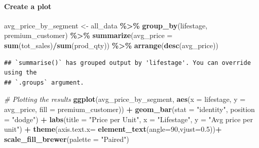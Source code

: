 \documentclass[
]{article}
\newenvironment{Shaded}{\begin{snugshade}}{\end{snugshade}}
\newcommand{\AttributeTok}[1]{\textcolor[rgb]{0.13,0.29,0.53}{#1}}
\newcommand{\CommentTok}[1]{\textcolor[rgb]{0.56,0.35,0.01}{\textit{#1}}}
\newcommand{\DecValTok}[1]{\textcolor[rgb]{0.00,0.00,0.81}{#1}}
\newcommand{\FloatTok}[1]{\textcolor[rgb]{0.00,0.00,0.81}{#1}}
\newcommand{\FunctionTok}[1]{\textcolor[rgb]{0.13,0.29,0.53}{\textbf{#1}}}
\newcommand{\NormalTok}[1]{#1}
\newcommand{\OtherTok}[1]{\textcolor[rgb]{0.56,0.35,0.01}{#1}}
\newcommand{\SpecialCharTok}[1]{\textcolor[rgb]{0.81,0.36,0.00}{\textbf{#1}}}
\newcommand{\StringTok}[1]{\textcolor[rgb]{0.31,0.60,0.02}{#1}}
\begin{document}
\hypertarget{create-a-plot-3}{%
\paragraph{Create a plot}\label{create-a-plot-3}}

\begin{Shaded}
\begin{Highlighting}[]
\NormalTok{avg\_price\_by\_segment }\OtherTok{\textless{}{-}}\NormalTok{ all\_data }\SpecialCharTok{\%\textgreater{}\%}
  \FunctionTok{group\_by}\NormalTok{(lifestage, premium\_customer) }\SpecialCharTok{\%\textgreater{}\%}
  \FunctionTok{summarize}\NormalTok{(}\AttributeTok{avg\_price =} \FunctionTok{sum}\NormalTok{(tot\_sales)}\SpecialCharTok{/}\FunctionTok{sum}\NormalTok{(prod\_qty)) }\SpecialCharTok{\%\textgreater{}\%}
  \FunctionTok{arrange}\NormalTok{(}\FunctionTok{desc}\NormalTok{(avg\_price))}
\end{Highlighting}
\end{Shaded}

\begin{verbatim}
## `summarise()` has grouped output by 'lifestage'. You can override using the
## `.groups` argument.
\end{verbatim}

\begin{Shaded}
\begin{Highlighting}[]
\CommentTok{\# Plotting the results}
\FunctionTok{ggplot}\NormalTok{(avg\_price\_by\_segment, }\FunctionTok{aes}\NormalTok{(}\AttributeTok{x =}\NormalTok{ lifestage, }\AttributeTok{y =}\NormalTok{ avg\_price, }\AttributeTok{fill =}\NormalTok{ premium\_customer)) }\SpecialCharTok{+}
  \FunctionTok{geom\_bar}\NormalTok{(}\AttributeTok{stat =} \StringTok{"identity"}\NormalTok{, }\AttributeTok{position =} \StringTok{"dodge"}\NormalTok{) }\SpecialCharTok{+}
  \FunctionTok{labs}\NormalTok{(}\AttributeTok{title =} \StringTok{"Price per Unit"}\NormalTok{,}
       \AttributeTok{x =} \StringTok{"Lifestage"}\NormalTok{,}
       \AttributeTok{y =} \StringTok{"Avg price per unit"}\NormalTok{) }\SpecialCharTok{+}
  \FunctionTok{theme}\NormalTok{(}\AttributeTok{axis.text.x=} \FunctionTok{element\_text}\NormalTok{(}\AttributeTok{angle=}\DecValTok{90}\NormalTok{,}\AttributeTok{vjust=}\FloatTok{0.5}\NormalTok{))}\SpecialCharTok{+}
  \FunctionTok{scale\_fill\_brewer}\NormalTok{(}\AttributeTok{palette =} \StringTok{"Paired"}\NormalTok{)}
\end{Highlighting}
\end{Shaded}
\end{document}
